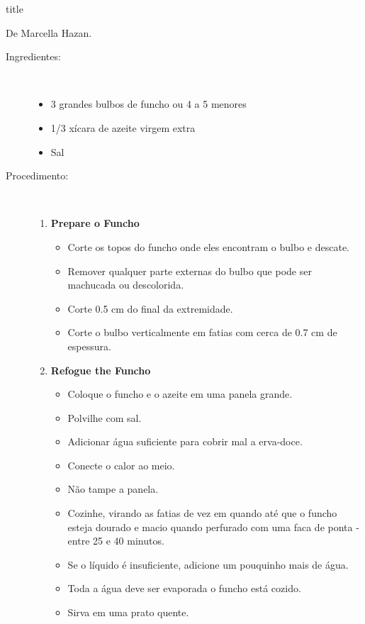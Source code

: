 \documentclass [11pt, letterpaper] {article}
\begin{document}
 {title}

\begin {flushright}
{\hspace {4in} De Marcella Hazan.}
\end {flushright}
\vspace {0.5in}



\begin {description}

\item [Ingredientes:] \ \\
\begin {itemize}
\item 3 grandes bulbos de funcho ou 4 a 5 menores
\item 1/3 xícara de azeite virgem extra
\item Sal
\end {itemize}

\item [Procedimento:] \ \\

\begin {enumerate}
\item {\bf Prepare o Funcho}
\begin {itemize}
\item Corte os topos do funcho onde eles encontram o bulbo e descate.
\item Remover qualquer parte externas do bulbo que pode ser machucada ou descolorida.
\item Corte 0.5 cm do final da extremidade.
\item Corte o bulbo verticalmente em fatias com cerca de 0.7 cm de espessura.
\end {itemize}

\item {\bf Refogue the Funcho}
\begin {itemize}
\item Coloque o funcho e o azeite em uma panela grande.
\item Polvilhe com sal.
\item Adicionar água suficiente para cobrir mal a erva-doce.
\item Conecte o calor ao meio.
\item Não tampe a panela.
\item Cozinhe, virando as fatias de vez em quando até que o funcho esteja  dourado e macio quando perfurado com uma faca de ponta - entre 25 e 40 minutos.
\item Se o líquido é insuficiente, adicione um pouquinho mais de água.
\item Toda a água deve ser evaporada o funcho est\'a cozido.
\item Sirva em uma prato quente.
\end {itemize}

\end {enumerate}
\end {description}
\end{document}
